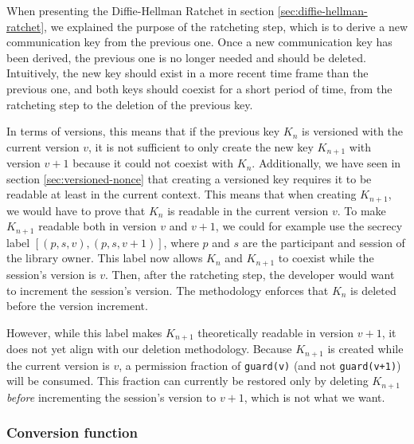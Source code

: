 When presenting the Diffie-Hellman Ratchet in section \ref{sec:diffie-hellman-ratchet}, we explained the purpose of the ratcheting step, which is to derive a new communication key from the previous one. Once a new communication key has been derived, the previous one is no longer needed and should be deleted.
Intuitively, the new key should exist in a more recent time frame than the previous one, and both keys should coexist for a short period of time, from the ratcheting step to the deletion of the previous key.

In terms of versions, this means that if the previous key $K_n$ is versioned with the current version $v$, it is not sufficient to only create the new key $K_{n+1}$ with version $v+1$ because it could not coexist with $K_n$.
Additionally, we have seen in section \ref{sec:versioned-nonce} that creating a versioned key requires it to be readable at least in the current context. This means that when creating $K_{n+1}$, we would have to prove that $K_n$ is readable in the current version $v$. To make $K_{n+1}$ readable both in version $v$ and $v+1$, we could for example use the secrecy label $[(p,s,v), (p,s,v+1)]$, where $p$ and $s$ are the participant and session of the library owner.
This label now allows $K_n$ and $K_{n+1}$ to coexist while the session's version is $v$.
Then, after the ratcheting step, the developer would want to increment the session's version. The methodology enforces that $K_n$ is deleted before the version increment.

However, while this label makes $K_{n+1}$ theoretically readable in version $v+1$, it does not yet align with our deletion methodology. Because $K_{n+1}$ is created while the current version is $v$, a permission fraction of \texttt{guard(v)} (and not \texttt{guard(v+1)}) will be consumed. This fraction can currently be restored only by deleting $K_{n+1}$ \emph{before} incrementing the session's version to $v+1$, which is not what we want.

\subsubsection{Conversion function}
\label{sec:conversion-function}

